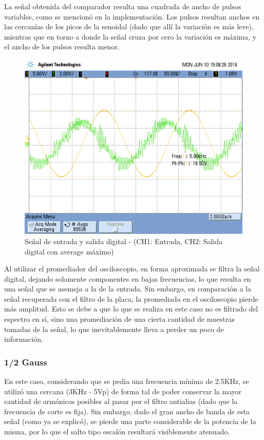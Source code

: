 \documentclass[assd_tp3_main.tex]{subfiles}
\begin{document}
La señal obtenida del comparador resulta una cuadrada de ancho de pulsos variables, como se mencionó en la implementación. Los pulsos resultan anchos en las cercanías de los picos de la senoidal (dado que allí la variación es más leve), mientras que en torno a donde la señal cruza por cero la variación es máxima, y el ancho de los pulsos resulta menor.

\begin{figure}[!ht]
\begin{centering}
\includegraphics[scale=0.25]{../EJ4/Mediciones/Seno/s1_4.png}
\par\end{centering}
\caption{Señal de entrada y salida digital - (CH1: Entrada, CH2: Salida digital con average máximo)}
\end{figure}

Al utilizar el promediador del osciloscopio, en forma aproximada se filtra la señal digital, dejando solamente componentes en bajas frecuencias, lo que resulta en una señal que se asemeja a la de la entrada. Sin embargo, en comparación a la señal recuperada con el filtro de la placa, la promediada en el osciloscopio pierde más amplitud. Esto se debe a que lo que se realiza en este caso no es filtrado del espectro en sí, sino una promediación de una cierta cantidad de muestras tomadas de la señal, lo que inevitablemente lleva a perder un poco de información.
\newpage

\subsubsection{1/2 Gauss}
En este caso, considerando que se pedía una frecuencia mínima de 2.5KHz, se utilizó una cercana (3KHz - 5Vp) de forma tal de poder conservar la mayor cantidad de armónicos posibles al pasar por el filtro antialias (dado que la frecuencia de corte es fija). Sin embargo, dado el gran ancho de banda de esta señal (como ya se explicó), se pierde una parte considerable de la potencia de la misma, por lo que el salto tipo escalón resultará visiblemente atenuado.
\end{document}
